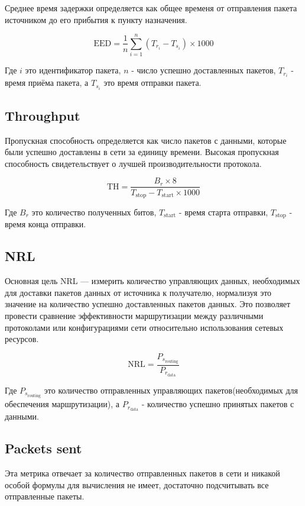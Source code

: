 Среднее время задержки определяется как общее временя от отправления пакета источником до его прибытия к пункту назначения.

\begin{equation}
  \label{eq:delay_calculation}
  \text{EED} = \frac{1}{n} \sum_{i=1}^{n}(T_{r_i} - T_{s_i}) \times 1000
\end{equation}

Где $i$ это идентификатор пакета, $n$ - число успешно доставленных пакетов, $T_{r_i}$ - время приёма пакета, а $T_{s_i}$ это время отправки пакета. 

\subsection*{Throughput}

Пропускная способность определяется как число пакетов с данными, которые были успешно доставлены в сети за единицу времени. Высокая пропускная способность свидетельствует о лучшей производительности протокола.

\begin{equation}
  \label{eq:throughput_calculation}
  \text{TH} = \frac{B_r \times 8}{T_{\text{stop}} - T_{\text{start}} \times 1000}
\end{equation}

Где $B_r$ это количество полученных битов, $T_{\text{start}}$ - время старта отправки, $T_{\text{stop}}$ - время конца отправки.

\subsection*{NRL} 

Основная цель NRL — измерить количество управляющих данных, необходимых для доставки пакетов данных от источника к получателю, нормализуя это значение на количество успешно доставленных пакетов данных. Это позволяет провести сравнение эффективности маршрутизации между различными протоколами или конфигурациями сети относительно использования сетевых ресурсов.

\begin{equation}
  \label{eq:nrl_calculation}
  \text{NRL} = \frac{P_{s_{\text{routing}}}}{P_{r_{\text{data}}}}
\end{equation}

Где $P_{s_{\text{routing}}}$ это количество отправленных управляющих пакетов(необходимых для обеспечения маршрутизации), а $P_{r_{\text{data}}}$ - количество успешно принятых пакетов с данными.

\subsection*{Packets sent}

Эта метрика отвечает за количество отправленных пакетов в сети и никакой особой формулы для вычисления не имеет, достаточно подсчитывать все отправленные пакеты.

